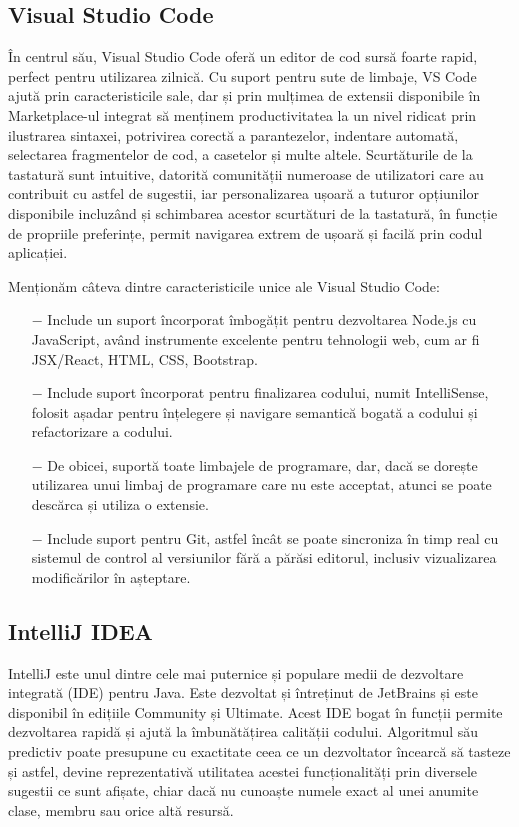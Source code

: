 \subsection{Visual Studio Code}
În centrul său, Visual Studio Code oferă un editor de cod sursă foarte rapid, perfect pentru utilizarea zilnică. Cu suport pentru sute de limbaje, VS Code ajută prin caracteristicile sale, dar și prin mulțimea de extensii disponibile în Marketplace-ul integrat să menținem productivitatea la un nivel ridicat prin ilustrarea sintaxei, potrivirea corectă a parantezelor, indentare automată, selectarea fragmentelor de cod, a casetelor și multe altele. Scurtăturile de la tastatură sunt intuitive, datorită comunității numeroase de utilizatori care au contribuit cu astfel de sugestii, iar personalizarea ușoară a tuturor opțiunilor disponibile incluzând și schimbarea acestor scurtături de la tastatură, în funcție de propriile preferințe, permit navigarea extrem de ușoară și facilă prin codul aplicației.\newline

Menționăm câteva dintre caracteristicile unice ale Visual Studio Code:
\begin{itemize}
	\addtolength{\itemindent}{1cm}
	\item[$-$]Include un suport încorporat îmbogățit pentru dezvoltarea Node.js cu JavaScript, având instrumente excelente pentru tehnologii web, cum ar fi JSX/React, HTML, CSS, Bootstrap.
	\item[$-$]Include suport încorporat pentru finalizarea codului, numit IntelliSense, folosit așadar pentru înțelegere și navigare semantică bogată a codului și refactorizare a codului.
	\item[$-$]De obicei, suportă toate limbajele de programare, dar, dacă se dorește utilizarea unui limbaj de programare care nu este acceptat, atunci se poate descărca și utiliza o extensie.
	\item[$-$]Include suport pentru Git, astfel încât se poate sincroniza în timp real cu sistemul de control al versiunilor fără a părăsi editorul, inclusiv vizualizarea modificărilor în așteptare.
	\newline
\end{itemize}



\subsection{IntelliJ IDEA}
IntelliJ este unul dintre cele mai puternice și populare medii de dezvoltare integrată (IDE) pentru Java. Este dezvoltat și întreținut de JetBrains și este disponibil în edițiile Community și Ultimate. Acest IDE bogat în funcții permite dezvoltarea rapidă și ajută la îmbunătățirea calității codului. Algoritmul său predictiv poate presupune cu exactitate ceea ce un dezvoltator încearcă să tasteze și astfel, devine reprezentativă utilitatea acestei funcționalități prin diversele sugestii ce sunt afișate, chiar dacă nu cunoaște numele exact al unei anumite clase, membru sau orice altă resursă.\newline

